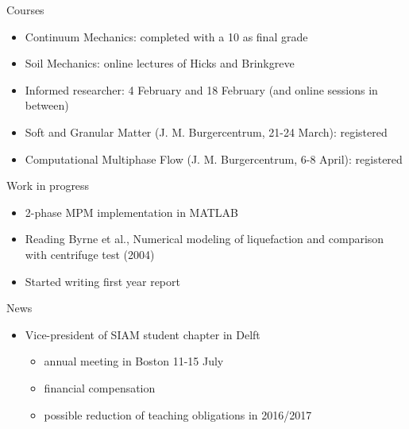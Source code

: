 \documentclass[mathserif,professionalfont,hyperref={pdfpagelabels=false}]{beamer}
\begin{document}
\begin{frame}{Courses}
\begin{itemize}
\item Continuum Mechanics: completed with a 10 as final grade
\pause
\item Soil Mechanics: online lectures of Hicks and Brinkgreve
\pause
\item Informed researcher: 4 February and 18 February (and online sessions in between)
\pause
\item Soft and Granular Matter (J. M. Burgercentrum, 21-24 March): registered
\pause
\item Computational Multiphase Flow (J. M. Burgercentrum, 6-8 April): registered
\end{itemize}
\end{frame}


\begin{frame}{Work in progress}
\begin{itemize}
\item 2-phase MPM implementation in MATLAB
\item Reading Byrne et al., Numerical modeling of liquefaction and comparison with centrifuge test (2004)
\item Started writing first year report 
\end{itemize}
\end{frame}

\begin{frame}{News}
\begin{itemize}
\item Vice-president of SIAM student chapter in Delft
\begin{itemize}
\item annual meeting in Boston 11-15 July
\item financial compensation 
\item possible reduction of teaching obligations in 2016/2017
\end{itemize}
\end{itemize}
\end{frame}



\appendix
\end{document}
